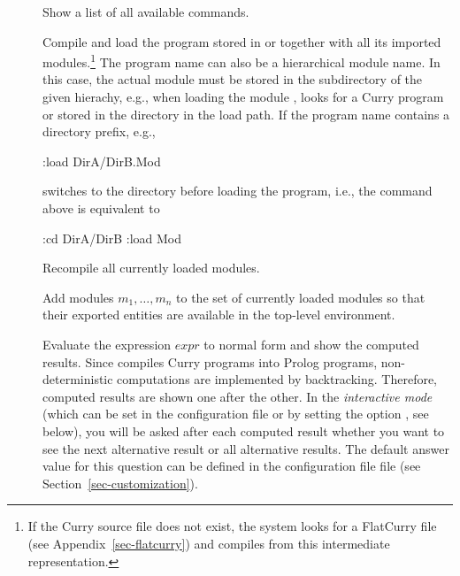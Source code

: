 \begin{description}
\item[]
Show a list of all available commands.

\item[]
Compile and load the program stored in
 or 
together with all its imported modules.\footnote{%
If the Curry source file does not exist, the system looks for a
FlatCurry file (see Appendix~\ref{sec-flatcurry}) 
and compiles from this intermediate representation.}
The program name can also be a hierarchical module name.
In this case, the actual module must be stored in the subdirectory
of the given hierachy, e.g., when loading the module ,
\CYS looks for a Curry program  or 
stored in the directory  in the load path.
If the program name contains a directory prefix, e.g.,
\begin{curry}
:load DirA/DirB.Mod
\end{curry}
\CYS switches to the directory before loading the program, i.e.,
the command above is equivalent to
\begin{curry}
:cd DirA/DirB
:load Mod
\end{curry}


\item[]
Recompile all currently loaded modules.

\item[]
Add modules $m_1,\ldots,m_n$ to the set of currently loaded modules
so that their exported entities are available in the top-level environment.

\item[] Evaluate the expression $expr$ to normal form
and show the computed results. Since \CYS
compiles Curry programs into Prolog programs,
non-deterministic computations are implemented by backtracking.
Therefore, computed results are shown one after the other.
In the \emph{interactive mode} (which can be set in the
configuration file \ccode{\curryrc} or by setting the option
, see below), you will be asked
after each computed result whether
you want to see the next alternative result or all alternative results.
The default answer value for this question can be defined
in the configuration file \ccode{\curryrc} file
(see Section~\ref{sec-customization}).


\end{description}
